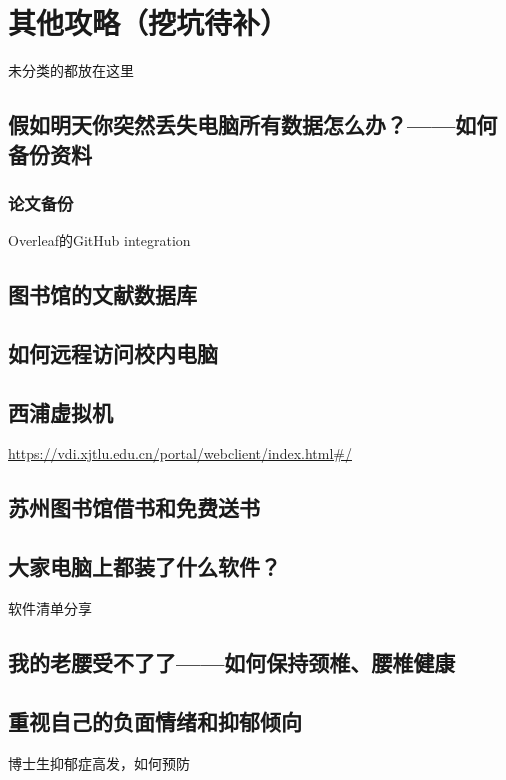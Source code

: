 
\chapter{其他攻略（挖坑待补）}

未分类的都放在这里

\section{假如明天你突然丢失电脑所有数据怎么办？——如何备份资料}
\subsection{论文备份}
Overleaf的GitHub integration
\section{图书馆的文献数据库}
\section{如何远程访问校内电脑}
\section{西浦虚拟机}
\url{https://vdi.xjtlu.edu.cn/portal/webclient/index.html#/}
\section{苏州图书馆借书和免费送书}
\section{大家电脑上都装了什么软件？}
软件清单分享
\section{我的老腰受不了了——如何保持颈椎、腰椎健康}
\section{重视自己的负面情绪和抑郁倾向}
博士生抑郁症高发，如何预防
